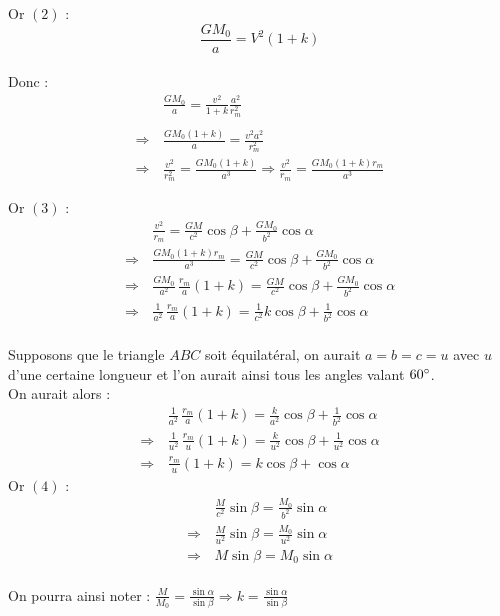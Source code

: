 \documentclass[12pt]{article}
\begin{document}
Or $(2)$ : \\
$$\frac{GM_0}{a} = V^2 (1+k)$$ \\
Donc : 
\begin{align*}
 &\boxed{\frac{GM_0}{a} = \frac{v^2}{1+k} \frac{a^2}{r_m^2}} \tag{5} \\ \\
 \Rightarrow \, &\frac{GM_0(1+k)}{a} = \frac{v^2 a^2}{r_m^2} \\
 \Rightarrow \, &\frac{v^2}{r_m^2} = \frac{GM_0(1+k)}{a^3} \Rightarrow \frac{v^2}{r_m} = \frac{GM_0(1+k)r_m}{a^3}
\end{align*} 

Or $(3)$ : 
\begin{align*}
&\frac{v^2}{r_m} = \frac{GM}{c^2} \cos \beta + \frac{GM_0}{b^2} \cos \alpha\\
\Rightarrow \, &\frac{GM_0(1+k)r_m}{a^3} = \frac{GM}{c^2} \cos \beta +\frac{GM_0}{b^2} \cos \alpha \\
\Rightarrow \, &\frac{GM_0}{a^2} \, \frac{r_m}{a} (1+k) = \frac{GM}{c^2} \cos \beta + \frac{GM_0}{b^2} \cos \alpha \\
\Rightarrow \, &\boxed{\frac{1}{a^2} \, \frac{r_m}{a}(1+k) = \frac{1}{c^2}k\cos \beta + \frac{1}{b^2} \cos \alpha} \tag{6}
\end{align*}\\
Supposons que le triangle $ABC$ soit équilatéral, on aurait $a=b=c=u$ avec $u$ d'une certaine longueur et l’on aurait ainsi tous les angles valant $60 \degree$. \\
On aurait alors : 
\begin{align*}
&\frac{1}{a^2} \, \frac{r_m}{a}(1+k) = \frac{k}{a^2} \cos \beta + \frac{1}{b^2} \cos \alpha \\
\Rightarrow \, &\frac{1}{u^2} \, \frac{r_m}{u}(1+k) = \frac{k}{u^2} \cos \beta + \frac{1}{u^2} \cos \alpha \\
\Rightarrow \, &\boxed{\frac{r_m}{u}(1+k) = k \cos \beta + \cos \alpha} \tag{7}
\end{align*}
Or $(4)$ : 
\begin{align*}
&\boxed{\frac{M}{c^2} \sin \beta = \frac{M_0}{b^2} \sin \alpha} \\
\Rightarrow \, &\frac{M}{u^2} \sin \beta = \frac{M_0}{u^2} \sin \alpha \\
\Rightarrow \, &\boxed{M \sin \beta = M_0 \sin \alpha} \tag{8}
\end{align*}\\
On pourra ainsi noter : $ \frac{M}{M_0} = \frac{\sin \alpha}{\sin \beta} \Rightarrow \boxed{k = \frac{\sin \alpha}{\sin \beta}}$ \\ \\
\end{document}
